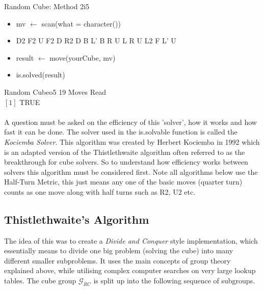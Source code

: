 \documentclass{article}
\newcounter{theo}[section]\setcounter{theo}{0}
\newcounter{lem}[section]\setcounter{lem}{0}
\begin{document}
\begin{myinput}{Random Cube: Method 2}{i5}
\begin{itemize}
\item mv $\leftarrow$ scan(what = character())
\item D2 F2 U F2 D R2 D B L' B R U L R U L2 F L' U
\item result $\leftarrow$ move(yourCube, mv)
\item is.solved(result)
\end{itemize}
\end{myinput}

\begin{myoutput}{Random Cube}{o5}
19 Moves Read \\
$[1]$ TRUE
\end{myoutput}

\paragraph*{}

A question must be asked on the efficiency of this 'solver', how it works and how fast it can be done. 
The solver used in the is.solvable function is called the \textit{Kociemba Solver}. This algorithm was created by Herbert Kociemba in 1992 which is an adapted version of the Thistlethwaite algorithm often referred to as the breakthrough for cube solvers\cite{Thistlethwaite}. So to understand how efficiency works between solvers this algorithm must be considered first. Note all algorithms below use the Half-Turn Metric, this just means any one of the basic moves (quarter turn) counts as one move along with half turns such as R2, U2 etc. 

\subsection{Thistlethwaite's Algorithm}

The idea of this was to create a \textit{Divide and Conquer} style implementation, which essentially means to divide one big problem (solving the cube) into many different smaller subproblems. It uses the main concepts of group theory explained above, while utilising complex computer searches on very large lookup tables. 
The cube group $\mathcal{G}_{RC}$ is split up into the following sequence of subgroups.  
\end{document}

